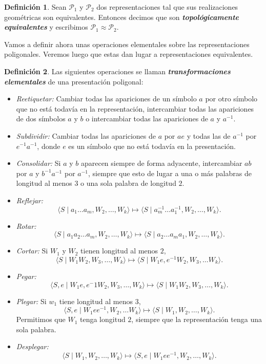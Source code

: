 \documentclass[10pt]{report}
\newcommand{\enfatiza}[1]{\textbf{\textit{#1}}}
\theoremstyle{definition}
\newtheorem{defin}{Definición}[section]
\begin{document}
\begin{defin}%
Sean $\mathcal{P}_1$ y $\mathcal{P}_2$ dos representaciones tal que sus realizaciones geométricas son equivalentes. Entonces decimos que son \enfatiza{topológicamente equivalentes} y escribimos $\mathcal{P}_1 \approx \mathcal{P}_2$.
\end{defin}

Vamos a definir ahora unas operaciones elementales sobre las representaciones poligonales. Veremos luego que estas dan lugar a representaciones equivalentes.

\begin{defin}%
Las siguientes operaciones se llaman \enfatiza{transformaciones elementales} de una presentación poligonal:
\begin{itemize}
\item \textit{Reetiquetar:} Cambiar todas las apariciones de un símbolo $a$ por otro símbolo que no está todavía en la representación, intercambiar todas las apariciones de dos símbolos $a$ y $b$ o intercambiar todas las apariciones de $a$ y $a^{-1}$.
\item \textit{Subdividir:} Cambiar todas las apariciones de $a$ por $ae$ y todas las de $a^{-1}$ por $e^{-1}a^{-1}$, donde $e$ es un símbolo que no está todavía en la presentación.
\item \textit{Consolidar:} Si $a$ y $b$ aparecen siempre de forma adyacente, intercambiar $ab$ por $a$ y $b^{-1}a^{-1}$ por $a^{-1}$, siempre que esto de lugar a una o más palabras de longitud al menos $3$ o una sola palabra de longitud $2$.
\item \textit{Reflejar:} $$\langle S\mid   a_1 \dots a_m, W_2,\dots,W_k\rangle \mapsto \langle S\mid   a_m^{-1}\dots a_1^{-1}, W_2, \dots ,W_k\rangle .$$
\item \textit{Rotar:} $$\langle S\mid a_1a_2\dots a_m, W_2,\dots , W_k\rangle \mapsto \langle S\mid   a_2\dots a_ma_1, W_2,\dots , W_k\rangle .$$
\item \textit{Cortar:} Si $W_1$ y $W_2$ tienen longitud al menos $2$, $$\langle S\mid W_1W_2, W_3,\dots , W_k\rangle \mapsto \langle S\mid W_1e, e^{-1}W_2, W_3,\dots W_k\rangle .$$
\item \textit{Pegar:} $$\langle S,e\mid W_1e, e^-1W_2, W_3,\dots , W_k\rangle \mapsto \langle S\mid W_1W_2, W_3,\dots , W_k\rangle .$$
\item \textit{Plegar:} Si $w_1$ tiene longitud al menos $3$, $$\langle S,e\mid W_1ee^{-1}, W_2,\dots W_k\rangle \mapsto \langle S\mid W_1, W_2,\dots , W_k\rangle .$$ Permitimos que $W_1$ tenga longitud $2$, siempre que la representación tenga una sola palabra.
\item \textit{Desplegar:} $$\langle S\mid W_1, W_2,\dots , W_k\rangle \mapsto \langle S,e\mid W_1ee^{-1}, W_2,\dots , W_k\rangle .$$
\end{itemize}
\end{defin}
\end{document}
